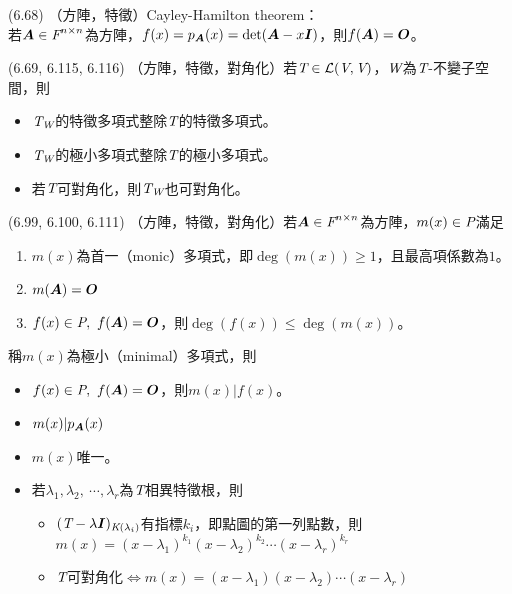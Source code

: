 \item \begin{theorem}{(6.68)} （方陣，特徵）Cayley-Hamilton theorem： \\
	若$\mat{A} \in \F^{n \times n}$為方陣，$f(x) = p_{\mat{A}}(x) = \det(\mat{A} - x\mat{I})$，則$f(\mat{A}) = \mat{O}$。
\end{theorem}

\item \begin{theorem}{(6.69, 6.115, 6.116)} （方陣，特徵，對角化）若$\T \in \L(\V, \V)$，$\spc{W}$為$\T$-不變子空間，則
	\begin{itemize}
		\item $\T_\spc{W}$的特徵多項式整除$\T$的特徵多項式。
		\item $\T_\spc{W}$的極小多項式整除$\T$的極小多項式。
		\item 若$\T$可對角化，則$\T_{\spc{W}}$也可對角化。
	\end{itemize}
\end{theorem}

\item \begin{theorem}{(6.99, 6.100, 6.111)} （方陣，特徵，對角化）若$\mat{A} \in \F^{n \times n}$為方陣，$m(x) \in \P$滿足
	\begin{enumerate}
		\item $m(x)$為首一（monic）多項式，即$\deg(m(x)) \ge 1$，且最高項係數為$1$。
		\item $m(\mat{A}) = \mat{O}$
		\item $f(x) \in \P, \ f(\mat{A}) = \mat{O}$，則$\deg(f(x)) \le \deg(m(x))$。
	\end{enumerate}
	稱$m(x)$為極小（minimal）多項式，則
	\begin{itemize}
		\item $f(x) \in \P, \ f(\mat{A}) = \mat{O}$，則$m(x) | f(x)$。
		\item $m(x) | p_{\mat{A}}(x)$
		\item $m(x)$唯一。
		\item 若$\lambda_1, \lambda_2, \ \cdots, \lambda_r$為$\T$相異特徵根，則
		\begin{itemize}
			\item $(\T - \lambda\mat{I})_{\textit{K}(\lambda_i)}$有指標$k_i$，即點圖的第一列點數，則
			$m(x) = (x - \lambda_1)^{k_1}(x - \lambda_2)^{k_2}\cdots(x - \lambda_r)^{k_r}$
			\item $\T$可對角化$\iff$$m(x) = (x - \lambda_1)(x - \lambda_2)\cdots(x - \lambda_r)$
		\end{itemize}
	\end{itemize}
\end{theorem}
